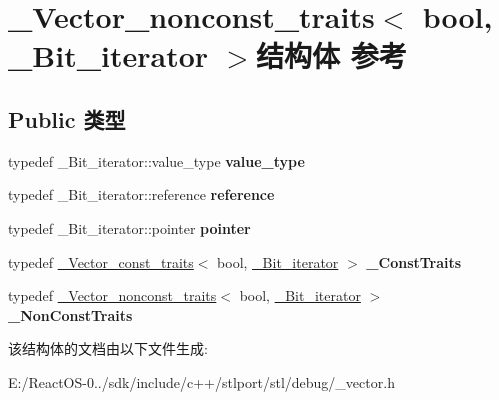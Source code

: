 \hypertarget{struct___vector__nonconst__traits_3_01bool_00_01___bit__iterator_01_4}{}\section{\+\_\+\+Vector\+\_\+nonconst\+\_\+traits$<$ bool, \+\_\+\+Bit\+\_\+iterator $>$结构体 参考}
\label{struct___vector__nonconst__traits_3_01bool_00_01___bit__iterator_01_4}
\subsection*{Public 类型}
\begin{DoxyCompactItemize}
\item 
\mbox{\label{struct___vector__nonconst__traits_3_01bool_00_01___bit__iterator_01_4_a551873e500c6145113d72a211eb56f5f}} 
typedef \+\_\+\+Bit\+\_\+iterator\+::value\+\_\+type {\bfseries value\+\_\+type}
\item 
\mbox{\label{struct___vector__nonconst__traits_3_01bool_00_01___bit__iterator_01_4_a4687e793720b9106c30812dfbcf39faf}} 
typedef \+\_\+\+Bit\+\_\+iterator\+::reference {\bfseries reference}
\item 
\mbox{\label{struct___vector__nonconst__traits_3_01bool_00_01___bit__iterator_01_4_add70c6554b34a0bb48b4d176988de826}} 
typedef \+\_\+\+Bit\+\_\+iterator\+::pointer {\bfseries pointer}
\item 
\mbox{\label{struct___vector__nonconst__traits_3_01bool_00_01___bit__iterator_01_4_a4832b1a861c0655c8686c2f9e959d81a}} 
typedef \hyperlink{struct___vector__const__traits}{\+\_\+\+Vector\+\_\+const\+\_\+traits}$<$ bool, \hyperlink{struct___bit__iter}{\+\_\+\+Bit\+\_\+iterator} $>$ {\bfseries \+\_\+\+Const\+Traits}
\item 
\mbox{\label{struct___vector__nonconst__traits_3_01bool_00_01___bit__iterator_01_4_ab321ef938274379b203eb45e3e5a2de2}} 
typedef \hyperlink{struct___vector__nonconst__traits}{\+\_\+\+Vector\+\_\+nonconst\+\_\+traits}$<$ bool, \hyperlink{struct___bit__iter}{\+\_\+\+Bit\+\_\+iterator} $>$ {\bfseries \+\_\+\+Non\+Const\+Traits}
\end{DoxyCompactItemize}


该结构体的文档由以下文件生成\+:\begin{DoxyCompactItemize}
\item 
E\+:/\+React\+O\+S-\/0../sdk/include/c++/stlport/stl/debug/\+\_\+vector.\+h\end{DoxyCompactItemize}
